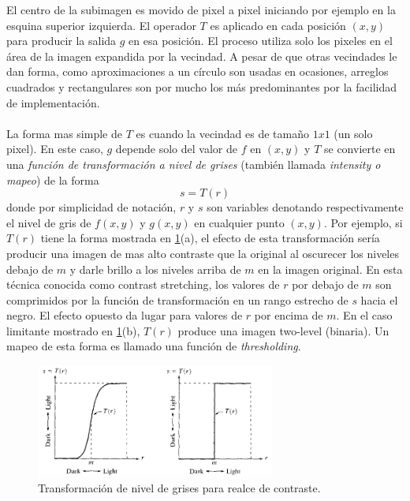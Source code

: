 			El centro de la subimagen es movido de pixel a pixel iniciando por ejemplo en la esquina superior izquierda. El operador $T$ es aplicado en cada posición $(x,y)$ para producir la salida $g$ en esa posición. El proceso utiliza solo los pixeles en el área de la imagen expandida por la vecindad. A pesar de que otras vecindades le dan forma, como aproximaciones a un círculo son usadas en ocasiones, arreglos cuadrados y rectangulares son por mucho los más predominantes por la facilidad de implementación.
			\\\\%
			La forma mas simple de $T$ es cuando la vecindad es de tamaño $1x1$ (un solo pixel). En este caso, $g$ depende solo del valor de $f$ en $(x,y)$ y $T$ se convierte en una \textit{función de transformación a nivel de grises} (también llamada \textit{intensity o mapeo}) de la forma
			\begin{equation}
			\label{eq:str_eq}
				s = T(r)
			\end{equation}
			donde por simplicidad de notación, $r$ y $s$ son variables denotando respectivamente el nivel de gris de $f(x,y)$ y $g(x,y)$ en cualquier punto $(x,y)$. Por ejemplo, si $T(r)$ tiene la forma mostrada en \ref{fig:contrast__enhanc}(a), el efecto de esta transformación sería producir una imagen de mas alto contraste que la original al oscurecer los niveles debajo de $m$ y darle brillo a los niveles arriba de $m$ en la imagen original. En esta técnica conocida como contrast stretching, los valores de $r$ por debajo de $m$ son comprimidos por la función de transformación en un rango estrecho de $s$ hacia el negro. El efecto opuesto da lugar para valores de $r$ por encima de $m$. En el caso limitante mostrado en \ref{fig:contrast__enhanc}(b), $T(r)$ produce una imagen two-level (binaria). Un mapeo de esta forma es llamado una función de \textit{thresholding}.
			
			\begin{figure}[H]
				\centering
				\includegraphics[width=0.7\textwidth]{capitulo2/images/glev_trans.png}
				\caption{Transformación de nivel de grises para realce de contraste.}
				\label{fig:contrast__enhanc}
			\end{figure}
